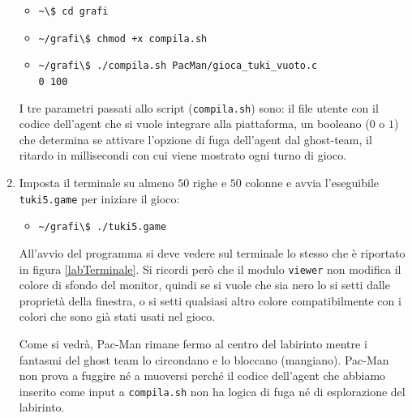 \documentclass[8pt]{book}
\begin{document}
\begin{enumerate}
  \begin{itemize}
  \item
    \texttt{\textasciitilde{}\textbackslash{}\$ cd grafi}
  \item
    \texttt{\textasciitilde{}/grafi\textbackslash{}\$ chmod +x compila.sh}
  \item
    \texttt{\textasciitilde{}/grafi\textbackslash{}\$ ./compila.sh PacMan/gioca\_tuki\_vuoto.c\\0 100}
  \end{itemize}
  
  I tre parametri passati allo script (\texttt{compila.sh}) sono: il file utente con il codice dell'agent che si vuole integrare alla piattaforma, un booleano ($0$ o $1$) che determina se attivare l'opzione di fuga dell'agent dal ghost-team, il ritardo in millisecondi con cui viene mostrato ogni turno di gioco.
\item
  Imposta il terminale su almeno $50$ righe e $50$ colonne e avvia l'eseguibile \texttt{tuki5.game} per iniziare il gioco:

  \begin{itemize}
  \item
    \texttt{\textasciitilde{}/grafi\textbackslash{}\$ ./tuki5.game}
  \end{itemize}

  All'avvio del programma si deve vedere sul terminale lo stesso che è riportato in figura \ref{labTerminale}. Si ricordi però che il modulo \texttt{viewer} non modifica il colore di sfondo del monitor, quindi se si vuole che sia nero lo si setti dalle proprietà della finestra, o si setti qualsiasi altro colore compatibilmente con i colori che sono già stati usati nel gioco.

  Come si vedrà, Pac-Man rimane fermo al centro del labirinto mentre i fantasmi del ghost team lo circondano e lo bloccano (mangiano). Pac-Man non prova a fuggire né a muoversi perché il codice dell'agent che abbiamo inserito come input a \texttt{compila.sh} non ha logica di fuga né di esplorazione del labirinto.
\end{enumerate}
\end{document}
